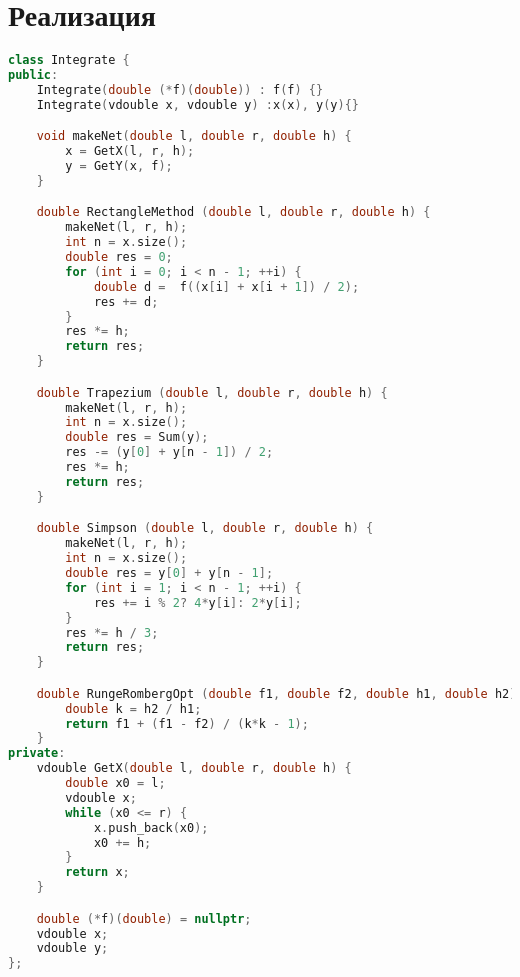 \section*{Реализация}

\begin{lstlisting}[language=C++]
class Integrate {
public:
    Integrate(double (*f)(double)) : f(f) {}
    Integrate(vdouble x, vdouble y) :x(x), y(y){}

    void makeNet(double l, double r, double h) {
        x = GetX(l, r, h);
        y = GetY(x, f);
    }

    double RectangleMethod (double l, double r, double h) {
        makeNet(l, r, h);
        int n = x.size();
        double res = 0;
        for (int i = 0; i < n - 1; ++i) {
            double d =  f((x[i] + x[i + 1]) / 2);
            res += d;
        }
        res *= h;
        return res;
    }

    double Trapezium (double l, double r, double h) {
        makeNet(l, r, h);
        int n = x.size();
        double res = Sum(y);
        res -= (y[0] + y[n - 1]) / 2;
        res *= h;
        return res;
    }

    double Simpson (double l, double r, double h) {
        makeNet(l, r, h);
        int n = x.size();
        double res = y[0] + y[n - 1];
        for (int i = 1; i < n - 1; ++i) {
            res += i % 2? 4*y[i]: 2*y[i];
        }
        res *= h / 3;
        return res;
    }

    double RungeRombergOpt (double f1, double f2, double h1, double h2) {
        double k = h2 / h1;
        return f1 + (f1 - f2) / (k*k - 1);
    }
private:
    vdouble GetX(double l, double r, double h) {
        double x0 = l;
        vdouble x;
        while (x0 <= r) {
            x.push_back(x0);
            x0 += h;
        }
        return x;
    }

    double (*f)(double) = nullptr;
    vdouble x;
    vdouble y;
};
\end{lstlisting}

\pagebreak
